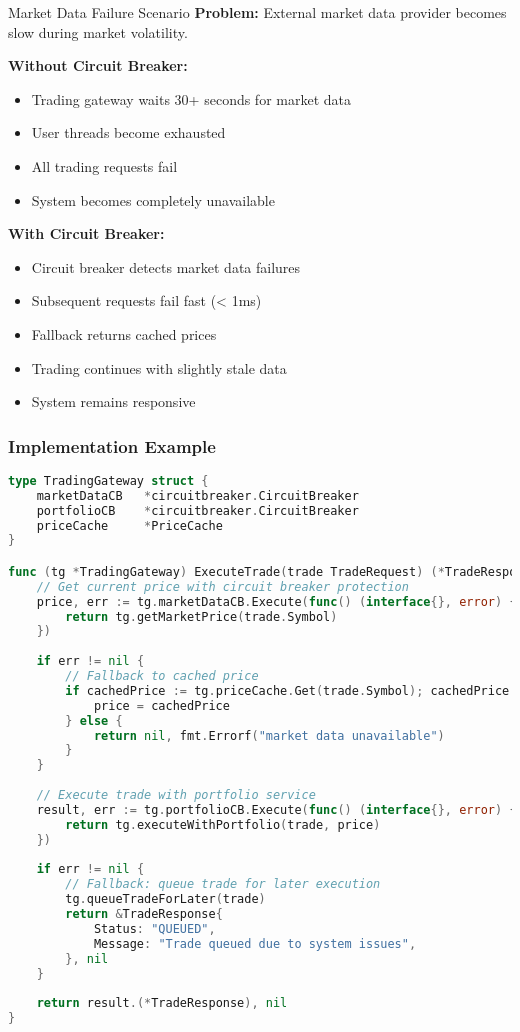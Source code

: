 \documentclass[12pt,a4paper]{article}
\begin{document}
\begin{examplebox}{Market Data Failure Scenario}
\textbf{Problem:} External market data provider becomes slow during market volatility.

\textbf{Without Circuit Breaker:}
\begin{itemize}
    \item Trading gateway waits 30+ seconds for market data
    \item User threads become exhausted
    \item All trading requests fail
    \item System becomes completely unavailable
\end{itemize}

\textbf{With Circuit Breaker:}
\begin{itemize}
    \item Circuit breaker detects market data failures
    \item Subsequent requests fail fast (< 1ms)
    \item Fallback returns cached prices
    \item Trading continues with slightly stale data
    \item System remains responsive
\end{itemize}
\end{examplebox}

\subsubsection{Implementation Example}

\begin{lstlisting}[language=Go, caption=Trading Gateway with Circuit Breaker]
type TradingGateway struct {
    marketDataCB   *circuitbreaker.CircuitBreaker
    portfolioCB    *circuitbreaker.CircuitBreaker
    priceCache     *PriceCache
}

func (tg *TradingGateway) ExecuteTrade(trade TradeRequest) (*TradeResponse, error) {
    // Get current price with circuit breaker protection
    price, err := tg.marketDataCB.Execute(func() (interface{}, error) {
        return tg.getMarketPrice(trade.Symbol)
    })
    
    if err != nil {
        // Fallback to cached price
        if cachedPrice := tg.priceCache.Get(trade.Symbol); cachedPrice != nil {
            price = cachedPrice
        } else {
            return nil, fmt.Errorf("market data unavailable")
        }
    }
    
    // Execute trade with portfolio service
    result, err := tg.portfolioCB.Execute(func() (interface{}, error) {
        return tg.executeWithPortfolio(trade, price)
    })
    
    if err != nil {
        // Fallback: queue trade for later execution
        tg.queueTradeForLater(trade)
        return &TradeResponse{
            Status: "QUEUED",
            Message: "Trade queued due to system issues",
        }, nil
    }
    
    return result.(*TradeResponse), nil
}
\end{lstlisting}
\end{document}

